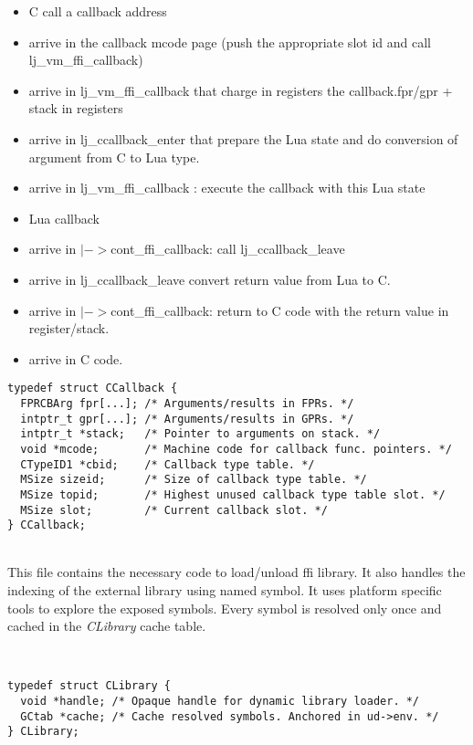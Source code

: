 \begin{itemize}
	\item C call a callback address
	\item arrive in the callback mcode page (push the appropriate slot id and call lj\_vm\_ffi\_callback)
	\item arrive in lj\_vm\_ffi\_callback that charge in registers the callback.fpr/gpr + stack in registers
	\item arrive in lj\_ccallback\_enter that prepare the Lua state and do conversion of argument from C to Lua type.
	\item arrive in lj\_vm\_ffi\_callback : execute the callback with this Lua state
	\item Lua callback
	\item arrive in $|->$cont\_ffi\_callback: call lj\_ccallback\_leave
	\item arrive in lj\_ccallback\_leave convert return value from Lua to C.
	\item arrive in $|->$cont\_ffi\_callback: return to C code with the return value in register/stack.
	\item arrive in C code.
\end{itemize}

\begin{lstlisting}[style=CStyle]
typedef struct CCallback {
  FPRCBArg fpr[...]; /* Arguments/results in FPRs. */
  intptr_t gpr[...]; /* Arguments/results in GPRs. */
  intptr_t *stack;   /* Pointer to arguments on stack. */
  void *mcode;       /* Machine code for callback func. pointers. */
  CTypeID1 *cbid;    /* Callback type table. */
  MSize sizeid;      /* Size of callback type table. */
  MSize topid;       /* Highest unused callback type table slot. */
  MSize slot;        /* Current callback slot. */
} CCallback;
\end{lstlisting}

\\
This file contains the necessary code to load/unload ffi library. It also handles
the indexing of the external library using named symbol. It uses platform
specific tools to explore the exposed symbols. Every symbol is resolved only once
and cached in the \emph{CLibrary} cache table.

\\
\begin{lstlisting}[style=CStyle]
typedef struct CLibrary {
  void *handle; /* Opaque handle for dynamic library loader. */
  GCtab *cache; /* Cache resolved symbols. Anchored in ud->env. */
} CLibrary;
\end{lstlisting}


    